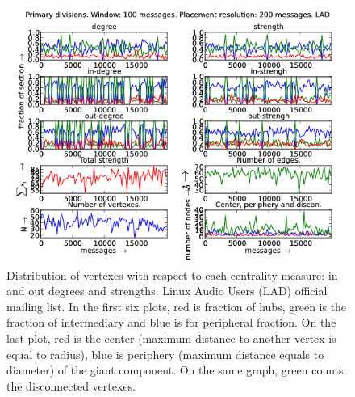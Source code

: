 \documentclass[%
 aip,
 jmp,%
 amsmath,amssymb,
 reprint,%
]{revtex4-1}
\begin{document}
\begin{figure}[hbtp] 
   \centering
        \includegraphics[width=\textwidth]{figs/LAD/100}
    \caption{Distribution of vertexes with respect to each centrality measure: in and out degrees and strengths. Linux Audio Users (LAD) official mailing list. In the first six plots, red is fraction of hubs, green is the fraction of intermediary and blue is for peripheral fraction. On the last plot, red is the center (maximum distance to another vertex is equal to radius), blue is periphery (maximum distance equals to diameter) of the giant component. On the same graph, green counts the disconnected vertexes.}
    \label{fig:lad100}
\end{figure}
\end{document}
